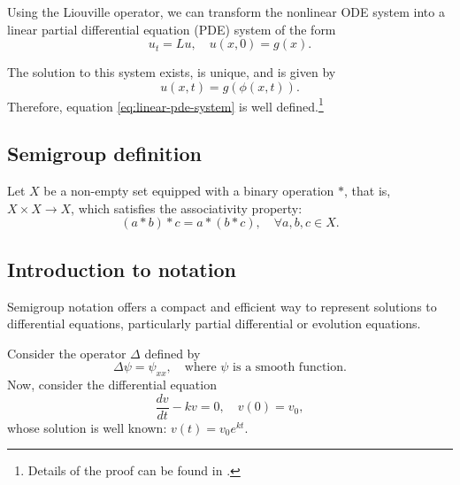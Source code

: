 \documentclass[12pt]{article}
\begin{document}
Using the Liouville operator, we can transform the nonlinear ODE system into a linear partial differential equation (PDE) system of the form
\begin{equation}
	u_t = Lu, \quad u(x,0) = g(x).
	\label{eq:linear-pde-system}
\end{equation}

The solution to this system exists, is unique, and is given by
\begin{equation}
	u(x,t) = g(\phi(x,t)).
	\label{eq:linear-pde-solution}
\end{equation}
Therefore, equation \eqref{eq:linear-pde-system} is well defined.\footnote{Details of the proof can be found in \citet[p.~181--182]{Chorin2013}.}


\subsection{Semigroup definition}
Let $X$ be a non-empty set equipped with a binary operation $*$, that is, $X \times X \to X$, which satisfies the associativity property:
\begin{equation*}
	(a * b) * c = a * (b * c), \quad \forall a,b,c \in X.
\end{equation*}

\subsection{Introduction to notation}
Semigroup notation offers a compact and efficient way to represent solutions to differential equations, particularly partial differential or evolution equations.

Consider the operator $\Delta$ defined by
\begin{equation*}
	\Delta \psi = \psi_{xx}, \quad \text{where $\psi$ is a smooth function}.
\end{equation*}
Now, consider the differential equation
\begin{equation*}
	\frac{dv}{dt} - kv = 0, \quad v(0) = v_0,
\end{equation*}
whose solution is well known: $v(t) = v_0 e^{kt}$.
\end{document}
